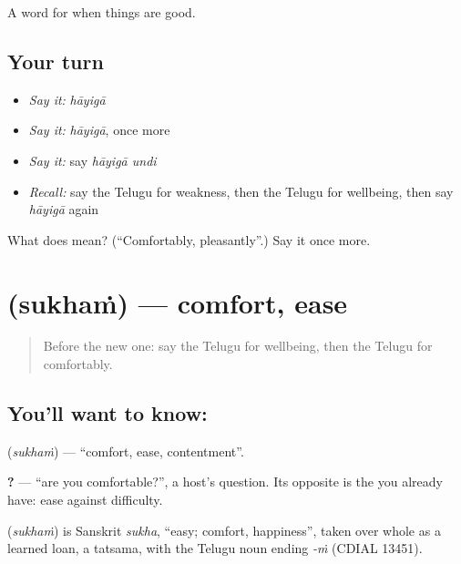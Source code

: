 \begin{grammarlens}[title={What you've built}]
A word for when things are good.
\end{grammarlens}

\subsection*{Your turn}
\begin{itemize}
\raggedright
  \item \emph{Say it:} \emph{hāyigā}
  \item \emph{Say it:} \emph{hāyigā}, once more
  \item \emph{Say it:} say \emph{hāyigā undi}
  \item \emph{Recall:} say the Telugu for weakness, then the Telugu for wellbeing, then say \emph{hāyigā} again
\end{itemize}

\begin{tcolorbox}[breakable,colback=teal!4,colframe=teal!35!black,title={Before you move on}]
What does  mean? (\textquotedblleft{}Comfortably, pleasantly\textquotedblright{}.) Say it once more.
\end{tcolorbox}
\section[\texorpdfstring{\te{సుఖం} (sukhaṁ)}{సుఖం (sukhaṁ)}]{ (sukhaṁ) — comfort, ease}

\label{lesson:TE-C93-ease}



\begin{quote}
Before the new one: say the Telugu for wellbeing, then the Telugu for comfortably.
\end{quote}

\subsection*{You'll want to know: }
\textbf{} (\emph{sukhaṁ}) — \textquotedblleft{}comfort, ease, contentment\textquotedblright{}.

\textbf{ ?} — \textquotedblleft{}are you comfortable?\textquotedblright{}, a host's question. Its opposite is the \textbf{} you already have: ease against difficulty.

\begin{cousinweb}
\textbf{} (\emph{sukhaṁ}) is Sanskrit \emph{sukha}, \textquotedblleft{}easy; comfort, happiness\textquotedblright{}, taken over whole as a learned loan, a tatsama, with the Telugu noun ending \emph{-ṁ} (CDIAL 13451).
\end{cousinweb}

